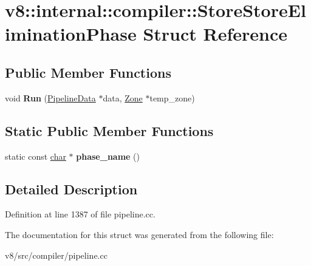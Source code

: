 \hypertarget{structv8_1_1internal_1_1compiler_1_1StoreStoreEliminationPhase}{}\section{v8\+:\+:internal\+:\+:compiler\+:\+:Store\+Store\+Elimination\+Phase Struct Reference}
\label{structv8_1_1internal_1_1compiler_1_1StoreStoreEliminationPhase}
\subsection*{Public Member Functions}
\begin{DoxyCompactItemize}
\item 
\mbox{\label{structv8_1_1internal_1_1compiler_1_1StoreStoreEliminationPhase_a6f630e49069e348e814870b7124dae63}} 
void {\bfseries Run} (\mbox{\hyperlink{classv8_1_1internal_1_1compiler_1_1PipelineData}{Pipeline\+Data}} $\ast$data, \mbox{\hyperlink{classv8_1_1internal_1_1Zone}{Zone}} $\ast$temp\+\_\+zone)
\end{DoxyCompactItemize}
\subsection*{Static Public Member Functions}
\begin{DoxyCompactItemize}
\item 
\mbox{\label{structv8_1_1internal_1_1compiler_1_1StoreStoreEliminationPhase_a761a0e7bae04e89c3065ebd9de7f7d06}} 
static const \mbox{\hyperlink{classchar}{char}} $\ast$ {\bfseries phase\+\_\+name} ()
\end{DoxyCompactItemize}


\subsection{Detailed Description}


Definition at line 1387 of file pipeline.\+cc.



The documentation for this struct was generated from the following file\+:\begin{DoxyCompactItemize}
\item 
v8/src/compiler/pipeline.\+cc\end{DoxyCompactItemize}
